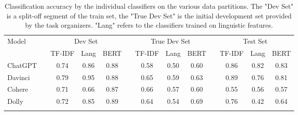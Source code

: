 \begin{table}[h]
    \centering
    \vspace{0.1cm}
    \begin{tabular}{lp{5px}cccp{5px}cccp{5px}ccc}
        \hline
        \multirow{2}{*}{Model} &  & \multicolumn{3}{c}{Dev Set} &             & \multicolumn{3}{c}{True Dev Set} &  & \multicolumn{3}{c}{Test Set}                                                                            \\
                               &  & \tiny{TF-IDF}               & \tiny{Lang} & \tiny{BERT}                      &  & \tiny{TF-IDF}                & \tiny{Lang} & \tiny{BERT} &  & \tiny{TF-IDF} & \tiny{Lang} & \tiny{BERT} \\
        \hline
        ChatGPT                &  & 0.74                        & 0.86        & 0.88                             &  & 0.58                         & 0.50        & 0.60        &  & 0.86          & 0.82        & 0.83        \\
        Davinci                &  & 0.79                        & 0.95        & 0.88                             &  & 0.65                         & 0.59        & 0.63        &  & 0.89          & 0.76        & 0.81        \\
        Cohere                 &  & 0.71                        & 0.66        & 0.87                             &  & 0.66                         & 0.57        & 0.60        &  & 0.55          & 0.56        & 0.57        \\
        Dolly                  &  & 0.72                        & 0.85        & 0.89                             &  & 0.64                         & 0.54        & 0.69        &  & 0.76          & 0.42        & 0.64        \\
        \hline
        \vspace{0.1cm}
    \end{tabular}
    \caption{
        Classification accuracy by the individual classifiers on the various data partitions.
        The "Dev Set" is a split-off segment of the train set, the "True Dev Set" is the initial development set provided by the task organizers.
        "Lang" refers to the classifiers trained on linguistic features.
    }
    \label{tab:subsolutions-initial}
\end{table}

